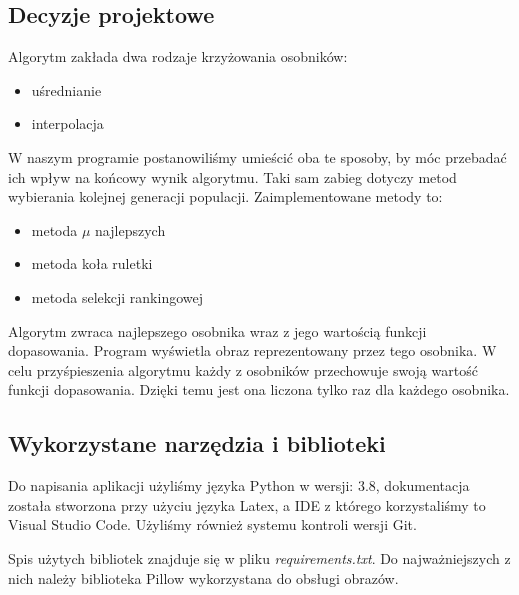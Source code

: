 \subsection{Decyzje projektowe}
Algorytm zakłada dwa rodzaje krzyżowania osobników:
\begin{itemize}
    \item uśrednianie
    \item interpolacja
\end{itemize}
W naszym programie postanowiliśmy umieścić oba te sposoby, by móc przebadać ich wpływ na końcowy wynik algorytmu.
Taki sam zabieg dotyczy metod wybierania kolejnej generacji populacji. Zaimplementowane metody to:
\begin{itemize}
    \item metoda $\mu$ najlepszych
    \item metoda koła ruletki
    \item metoda selekcji rankingowej
\end{itemize}
Algorytm zwraca najlepszego osobnika wraz z jego wartością funkcji dopasowania. Program wyświetla obraz reprezentowany przez tego osobnika.
W celu przyśpieszenia algorytmu każdy z osobników przechowuje swoją wartość funkcji dopasowania. Dzięki temu jest ona liczona tylko raz dla każdego osobnika.
\subsection{Wykorzystane narzędzia i biblioteki}
Do napisania aplikacji użyliśmy języka Python w wersji: 3.8, dokumentacja została stworzona przy użyciu języka Latex, a IDE z którego korzystaliśmy to Visual Studio Code. Użyliśmy również systemu kontroli wersji Git.

Spis użytych bibliotek znajduje się w pliku {\it requirements.txt}.
Do najważniejszych z nich należy biblioteka Pillow wykorzystana do obsługi obrazów.